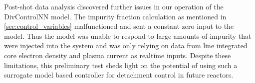 Post-shot data analysis discovered further issues in our operation of the DivControlNN model.
The impurity fraction calculation as mentioned in \ref{sec:control_variables} malfunctioned and sent a constant zero input to the model.
Thus the model was unable to respond to large amounts of impurity that were injected into the system and was only relying on data from line integrated core electron density and plasma current as realtime inputs.
Despite these limitations, this preliminary test sheds light on the potential of using such a surrogate model based controller for detachment control in future reactors.